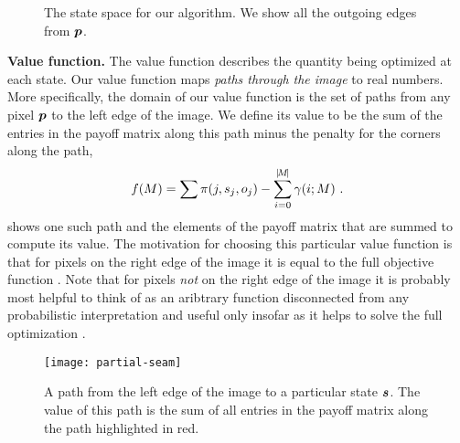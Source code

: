 \begin{figure}[tb]
  \centering
  \caption{The state space for our algorithm. We show all the outgoing
    edges from $\Pixel$.}
  \label{fig:state-space}
\end{figure}

\textbf{Value function.} The value function describes the quantity
being optimized at each state. Our value function maps \textit{paths
  through the image} to real numbers. More specifically, the domain of
our value function is the set of paths from any pixel $\Pixel$ to the
left edge of the image. We define its value to be the sum of the
entries in the payoff matrix along this path minus the penalty for the
corners along the path, \ie
\begin{equation}
  \Objective(\PartialScene) = \sum
    \PixelPayoff(j,\seam_j,\WallOrient_j) -
    \sum_{i=0}^{\SceneLen} \CornerPenalty(i;\PartialScene) ~.
  \label{eq:scene-value}
\end{equation}
 shows one such path and the elements of the
payoff matrix that are summed to compute its value. The motivation for
choosing this particular value function is that for pixels on the
right edge of the image it is equal to the full objective function
. Note that for pixels \textit{not} on the right
edge of the image it is probably most helpful to think of
 as an aribtrary function disconnected from any
probabilistic interpretation and useful only insofar as it helps to
solve the full optimization .

\begin{figure}[tb]
  \centering
  \texttt{[image: partial-seam]}
  \caption{A path from the left edge of the image to a particular
    state $\State$. The value of this path is the sum of all entries
    in the payoff matrix along the path highlighted in red.}
  \label{fig:partial-seam}
\end{figure}

